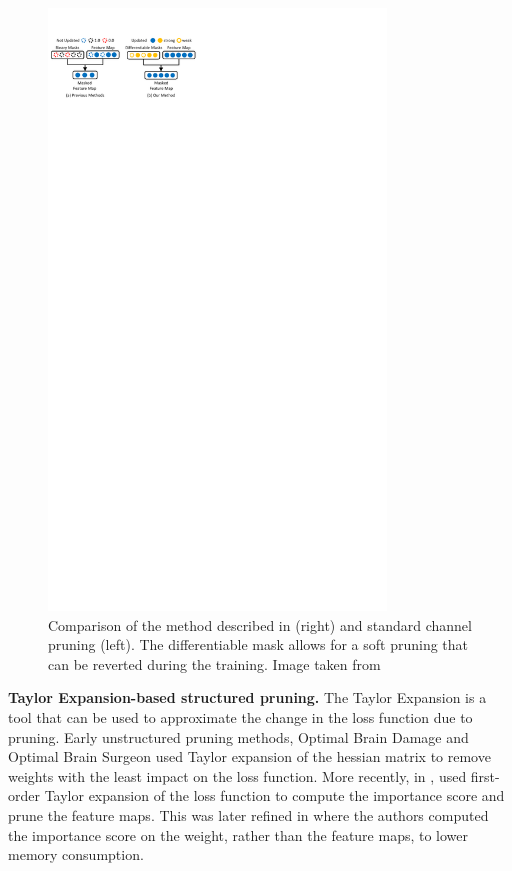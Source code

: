 \begin{figure}[htbp]
  \centering
  \includegraphics[width=0.8\textwidth,trim=0 0.4cm 0 0, clip]{chapter_sota/assets/operation_aware.pdf}
  \caption{Comparison of the method described in \cite{DBLP:conf/icml/KangH20}
    (right) and standard channel pruning (left). The differentiable mask allows
    for a soft pruning that can be reverted during the training. Image taken
    from \cite{DBLP:conf/icml/KangH20}}
  \label{fig:sota:operation_aware}
\end{figure}


\noindent \textbf{Taylor Expansion-based structured pruning.} The Taylor
Expansion is a tool that can be used to approximate the change in the loss
function due to pruning. Early unstructured pruning methods, Optimal Brain
Damage \cite{DBLP:conf/nips/CunDS89} and Optimal Brain Surgeon
\cite{DBLP:conf/icnn/HassibiSW93} used Taylor expansion of the hessian matrix to
remove weights with the least impact on the loss function. More recently, in
\cite{DBLP:conf/iclr/MolchanovTKAK17},
\citeauthor{DBLP:conf/iclr/MolchanovTKAK17} used first-order Taylor expansion of
the loss function to compute the importance score and prune the feature maps.
This was later refined in \cite{DBLP:conf/cvpr/MolchanovMTFK19} where the
authors computed the importance score on the weight, rather than the feature
maps, to lower memory consumption.\\

